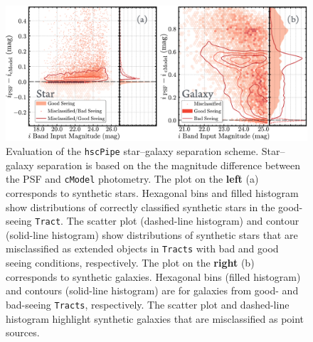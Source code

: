 \documentclass[useamsfonts]{pasj01}
\def\hscpipe{\texttt{hscPipe}}
\def\cmodel{\texttt{cModel}}
\def\tract{\texttt{Tract}}
\def\tracts{\texttt{Tracts}}
\begin{document}
\begin{figure}
    \begin{center}
        \includegraphics[width=\textwidth]{fig/synpipe_star_galaxy}
    \end{center}
    \caption{Evaluation of the \hscpipe{} star--galaxy separation scheme. Star--galaxy separation is based on the the magnitude difference between the PSF and \cmodel{} photometry. The plot on the \textbf{left} (a) corresponds to synthetic stars. Hexagonal bins and filled histogram show distributions of correctly classified
        synthetic stars in the good-seeing \tract{}.
 The scatter plot (dashed-line histogram) and contour (solid-line histogram)
        show distributions of synthetic stars that are misclassified as extended
        objects in \tracts{} with bad and good seeing conditions, respectively.
        The plot on the \textbf{right} (b) corresponds to synthetic 
        galaxies.
        Hexagonal bins (filled histogram) and contours (solid-line histogram)
        are for galaxies from good- and bad-seeing \tracts{}, respectively.
        The scatter plot and dashed-line histogram highlight synthetic galaxies that are
        misclassified as point sources.}
    \label{fig:sg}
\end{figure}
\end{document}
